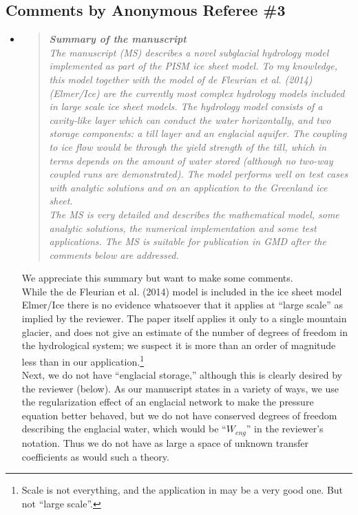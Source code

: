 \documentclass[11pt,reqno]{amsart}
\newcommand{\reply}[2]{
\medskip\medskip
\item  \begin{quote}
\emph{#1}
\end{quote}

\medskip
\noindent #2}
\begin{document}
\subsection*{Comments by Anonymous Referee \#3}\begin{itemize}
\reply{\textbf{Summary of the manuscript}\\
The manuscript (MS) describes a novel subglacial hydrology model implemented as
part of the PISM ice sheet model. To my knowledge, this model together with the
model of de Fleurian et al. (2014) (Elmer/Ice) are the currently most complex hydrology
models included in large scale ice sheet models. The hydrology model consists of a
cavity-like layer which can conduct the water horizontally, and two storage components:
a till layer and an englacial aquifer. The coupling to ice flow would be through the yield
strength of the till, which in terms depends on the amount of water stored (although no
two-way coupled runs are demonstrated). The model performs well on test cases with
analytic solutions and on an application to the Greenland ice sheet.\\
\indent The MS is very detailed and describes the mathematical model, some analytic solutions, the numerical implementation and some test applications. The MS is suitable for
publication in GMD after the comments below are addressed.}
{We appreciate this summary but want to make some comments. \\
\indent While the de Fleurian et al. (2014) \cite{deFleurianetal2014} model is included in the ice sheet model Elmer/Ice there is no evidence whatsoever that it applies at ``large scale'' as implied by the reviewer.  The paper \cite{deFleurianetal2014} itself applies it only to a single mountain glacier, and does not give an estimate of the number of degrees of freedom in the hydrological system; we suspect it is more than an order of magnitude less than in our application.\footnote{Scale is not everything, and the application in \cite{deFleurianetal2014} may be a very good one.  But not ``large scale''.} \\
\indent Next, we do not have ``englacial storage,'' although this is clearly desired by the reviewer (below).  As our manuscript states in a variety of ways, we use the regularization effect of an englacial network to make the pressure equation better behaved, but we do not have conserved degrees of freedom describing the englacial water, which would be ``$W_{eng}$'' in the reviewer's notation.  Thus we do not have as large a space of unknown transfer coefficients as would such a theory.}


\end{itemize}
\end{document}
